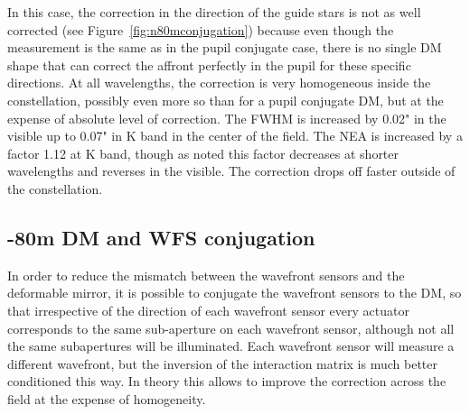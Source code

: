 \documentclass[aas_macros,10pt]{article}
\begin{document}
In this case, the correction in the direction of the guide stars is not as well corrected (see Figure~\ref{fig:n80mconjugation}) because even though the measurement is the same as in the pupil conjugate case, there is no single DM shape that can correct the affront perfectly in the pupil for these specific directions. At all wavelengths, the correction is very homogeneous inside the constellation, possibly even more so than for a pupil conjugate DM, but at the expense of absolute level of correction. The FWHM is increased by 0.02" in the visible up to 0.07" in K band in the center of the field. The NEA is increased by a factor 1.12 at K band, though as noted this factor decreases at shorter wavelengths and reverses in the visible. The correction drops off faster outside of the constellation.

\subsection{-80m DM and WFS conjugation}

In order to reduce the mismatch between the wavefront sensors and the deformable mirror, it is possible to conjugate the wavefront sensors to the DM, so that irrespective of the direction of each wavefront sensor every actuator  corresponds to the same sub-aperture on each wavefront sensor, although not all the same subapertures will be illuminated. Each wavefront sensor will measure a different wavefront, but the inversion of the interaction matrix is much better conditioned this way. In theory this allows to improve the correction across the field at the expense of homogeneity.
\end{document}
